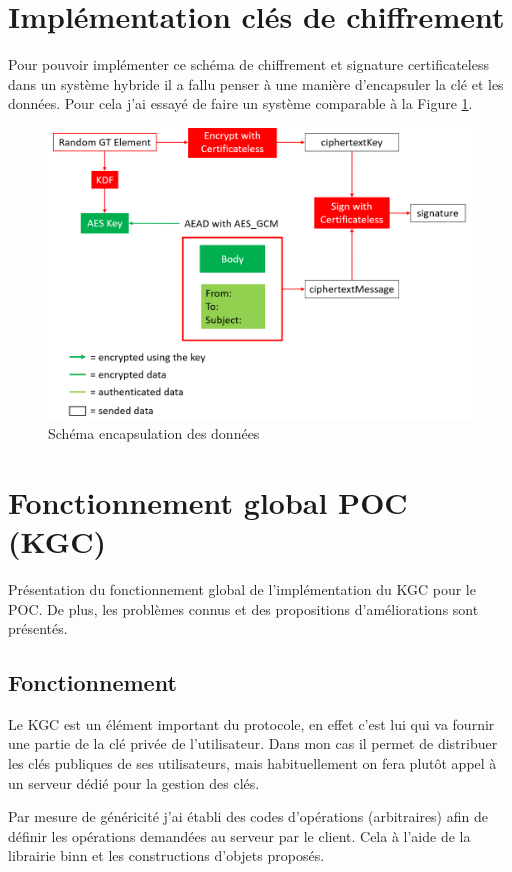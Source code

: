 \section{Implémentation clés  de chiffrement}
Pour pouvoir implémenter ce schéma de chiffrement et signature certificateless dans un système hybride il a fallu penser à une manière d'encapsuler la clé et les données. Pour cela j'ai essayé de faire un système comparable à la Figure \ref{fig:encapsulate}.

\begin{figure}[h!]
	\centering
	\includegraphics[width=\textwidth]{images/schemCles.png}
	\caption{Schéma encapsulation des données}
	\label{fig:encapsulate}
\end{figure}

\section{Fonctionnement global POC (KGC)}
Présentation du fonctionnement global de l'implémentation du KGC pour le POC. De plus, les problèmes connus et des propositions d'améliorations sont présentés.
\subsection{Fonctionnement}
Le KGC est un élément important du protocole, en effet c'est lui qui va fournir une partie de la clé privée de l'utilisateur. Dans mon cas il permet de distribuer les clés publiques de ses utilisateurs, mais habituellement on fera plutôt appel à un serveur dédié pour la gestion des clés.

Par mesure de généricité j'ai établi des codes d'opérations (arbitraires) afin de définir les opérations demandées au serveur par le client. Cela à l'aide de la librairie binn et les constructions d'objets proposés.

